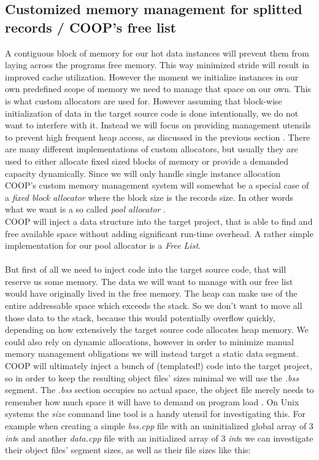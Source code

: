 \subsection{Customized memory management for splitted records / COOP's free list}\label{memory_management}
A contiguous block of memory for our hot data instances will prevent them from laying across the programs free memory. This way minimized stride will result in improved cache utilization. However the moment we initialize instances in our own predefined scope of memory we need to manage that space on our own. This is what custom allocators are used for.
However assuming that block-wise initialization of data in the target source code is done intentionally, we do not want to interfere with it. Instead we will focus on providing management utensils to prevent high frequent heap access, as discussed in the previous section . There are many different implementations of custom allocators, but usually they are used to either allocate fixed sized blocks of memory or provide a demanded capacity dynamically. Since we will only handle single instance allocation COOP's custom memory management system will somewhat be a special case of a \textit{fixed block allocator} where the block size is the records size. In other words what we want is a so called \textit{pool allocator} .\\
COOP will inject a data structure into the target project, that is able to find and free available space without adding significant run-time overhead. A rather simple implementation for our pool allocator is a \textit{Free List}.\\\\
But first of all we need to inject code into the target source code, that will reserve us some memory. The data we will want to manage with our free list would have originally lived in the free memory. The heap can make use of the entire addressable space which exceeds the stack. So we don't want to move all those data to the stack, because this would potentially overflow quickly, depending on how extensively the target source code allocates heap memory. We could also rely on dynamic allocations, however in order to minimize manual memory management obligations we will instead target a static data segment. COOP will ultimately inject a bunch of (templated!) code into the target project, so in order to keep the resulting object files' sizes minimal we will use the \textit{.bss} segment. The \textit{.bss} section occupies no actual space, the object file merely needs to remember how much space it will have to demand on program load . On Unix systems the \textit{size} command line tool is a handy utensil for investigating this. For example when creating a simple \textit{bss.cpp} file with an uninitialized global array of 3 \textit{int}s and another \textit{data.cpp} file with an initialized array of 3 \textit{int}s we can investigate their object files' segment sizes, as well as their file sizes like this: 
